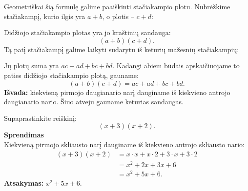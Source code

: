 \documentclass[11pt,a4paper]{scrartcl}
\begin{document}
Geometriškai šią formulę galime paaiškinti stačiakampio plotu. Nubrėžkime stačiakampį, kurio ilgis yra $a+b$, o plotis -- $c+d$:
\begin{center}
\end{center}
Didžiojo stačiakampio plotas yra jo kraštinių sandauga:
\[
(a+b)(c+d).
\]
Tą patį stačiakampį galime laikyti sudarytu iš keturių mažesnių stačiakampių:
\begin{center}
\end{center}
Jų plotų suma yra $ac+ad+bc+bd$. Kadangi abiem būdais apskaičiuojame to paties didžiojo stačiakampio plotą, gauname:
\[
(a+b)(c+d)=ac+ad+bc+bd.
\]
\textbf{Išvada:} kiekvieną pirmojo daugianario narį dauginame iš kiekvieno antrojo daugianario nario. Šiuo atveju gauname keturias sandaugas.

\begin{example}
Supaprastinkite reiškinį:
\[
(x+3)(x+2).
\]
\textbf{Sprendimas}\\
Kiekvieną pirmojo skliausto narį dauginame iš kiekvieno antrojo skliausto nario:
\[
\begin{aligned}
(x+3)(x+2)
&=x\cdot x+x\cdot2+3\cdot x+3\cdot2 \\
&=x^2+2x+3x+6 \\
&=x^2+5x+6.
\end{aligned}
\]
\textbf{Atsakymas:} $x^2+5x+6$.
\end{example}
\end{document}
